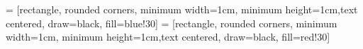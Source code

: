  = [rectangle, rounded corners, minimum width=1cm, minimum height=1cm,text centered, draw=black, fill=blue!30]
 = [rectangle, rounded corners, minimum width=1cm, minimum height=1cm,text centered, draw=black, fill=red!30]